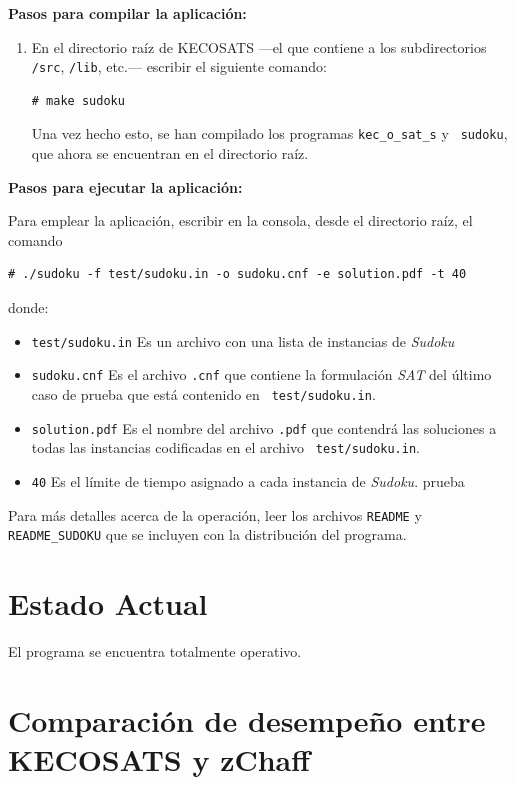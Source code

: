 \documentclass[12pt,lettersize,oneside]{article}
\begin{document}
\textbf{Pasos para compilar la aplicación:}
\begin{enumerate}
\item En el directorio raíz de KECOSATS ---el que contiene a los subdirectorios
  {\tt /src}, {\tt /lib}, etc.--- escribir el siguiente comando:
\begin{lstlisting}[style=consola]
# make sudoku
\end{lstlisting}

Una vez hecho esto, se han compilado los programas {\tt kec\_o\_sat\_s} y {\tt
  sudoku}, que ahora se encuentran en el directorio raíz.

\end{enumerate}

\textbf{Pasos para ejecutar la aplicación:}

Para emplear la aplicación, escribir en la consola, desde el directorio raíz, el
comando
\begin{lstlisting}[style=consola2]
# ./sudoku -f test/sudoku.in -o sudoku.cnf -e solution.pdf -t 40
\end{lstlisting}
donde:
\begin{itemize}
\item {\tt test/sudoku.in} Es un archivo con una lista de instancias de
  \emph{Sudoku}
\item {\tt sudoku.cnf} Es el archivo {\tt .cnf} que contiene la formulación
  \emph{SAT} del último caso de prueba que está contenido en {\tt
    test/sudoku.in}.
\item {\tt solution.pdf} Es el nombre del archivo {\tt .pdf} que contendrá las
  soluciones a todas las instancias codificadas en el archivo {\tt
    test/sudoku.in}.
\item{\tt 40} Es el límite de tiempo asignado a cada instancia de \emph{Sudoku}.
  prueba 
\end{itemize}

Para más detalles acerca de la operación, leer los archivos {\tt README} y {\tt
  README\_SUDOKU} que se incluyen con la distribución del programa.
\section{Estado Actual}
El programa se encuentra totalmente operativo.

\section{Comparación de desempeño entre KECOSATS y zChaff}
\end{document}
